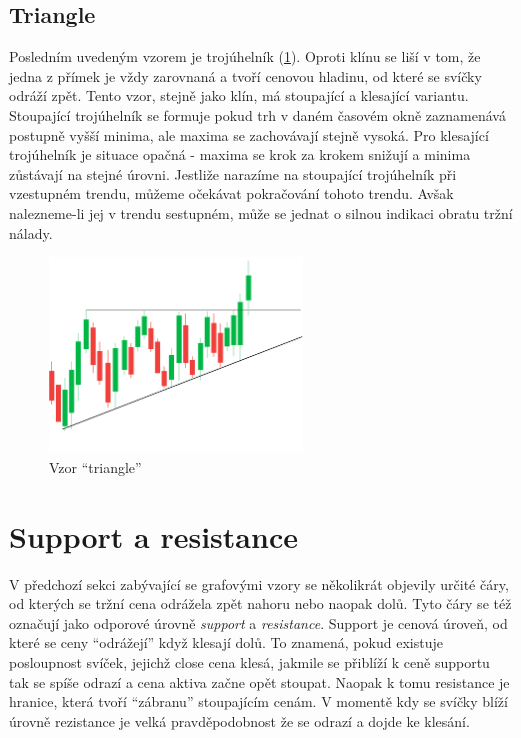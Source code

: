 \subsection{Triangle}
Posledním uvedeným vzorem je trojúhelník (\ref{fig:triangle}). Oproti klínu se liší v tom, že jedna z přímek je vždy zarovnaná a tvoří cenovou hladinu, od které se svíčky odráží zpět. Tento vzor, stejně
jako klín, má stoupající a klesající variantu. Stoupající trojúhelník se formuje pokud trh v daném časovém okně zaznamenává postupně vyšší minima, ale maxima se zachovávají stejně vysoká.
Pro klesající trojúhelník je situace opačná - maxima se krok za krokem snižují a minima zůstávají na stejné úrovni. Jestliže narazíme na stoupající trojúhelník při vzestupném trendu,
můžeme očekávat pokračování tohoto trendu. Avšak nalezneme-li jej v trendu sestupném, může se jednat o silnou indikaci obratu tržní nálady.
\begin{figure}[ht]
    \centering
    \includegraphics[width=0.6\textwidth]{Figures/triangle.pdf}
    \caption{Vzor \enquote{triangle}}
    \label{fig:triangle}
\end{figure}

\clearpage
\newpage


\section{Support a resistance}
\label{sec:TrendingLines}
V předchozí sekci zabývající se grafovými vzory se několikrát objevily určité čáry, od kterých se tržní cena odrážela zpět nahoru nebo naopak dolů. Tyto čáry se též označují jako odporové
úrovně \emph{support} a \emph{resistance}. Support je cenová úroveň, od které se ceny \enquote{odrážejí} když klesají dolů. To znamená, pokud existuje posloupnost svíček, jejichž close cena
klesá, jakmile se přiblíží k ceně supportu tak se spíše odrazí a cena aktiva začne opět stoupat. Naopak k tomu resistance je hranice, která tvoří \enquote{zábranu} stoupajícím cenám.
V momentě kdy se svíčky blíží úrovně rezistance je velká pravděpodobnost že se odrazí a dojde ke klesání.


